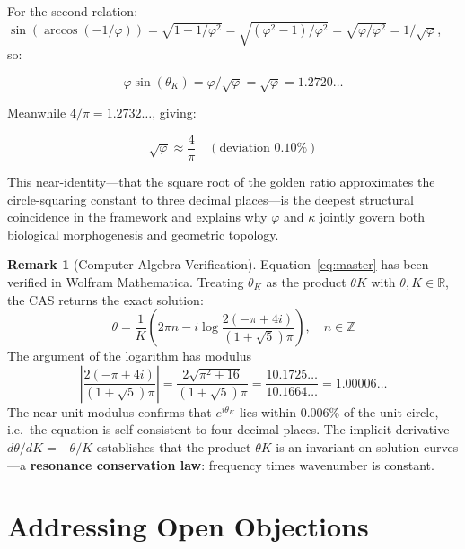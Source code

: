 \documentclass[12pt,a4paper]{article}
\theoremstyle{plain}
\theoremstyle{definition}
\newtheorem{remark}[theorem]{Remark}
\newcommand{\thetaK}{\theta_K}
\newcommand{\golden}{\varphi}
\newcommand{\kap}{\kappa}
\begin{document}
For the second relation: $\sin(\arccos(-1/\golden)) = \sqrt{1 - 1/\golden^2} = \sqrt{(\golden^2 - 1)/\golden^2} = \sqrt{\golden/\golden^2} = 1/\sqrt{\golden}$, so:

\begin{equation}
\golden \sin(\thetaK) = \golden / \sqrt{\golden} = \sqrt{\golden} = 1.2720\ldots
\end{equation}

Meanwhile $4/\pi = 1.2732\ldots$, giving:

\begin{equation}
\sqrt{\golden} \approx \frac{4}{\pi} \quad (\text{deviation } 0.10\%)
\end{equation}

This near-identity---that the square root of the golden ratio approximates the circle-squaring constant to three decimal places---is the deepest structural coincidence in the framework and explains why $\golden$ and $\kap$ jointly govern both biological morphogenesis and geometric topology.

\begin{remark}[Computer Algebra Verification]
\label{rem:wolfram}
Equation~\eqref{eq:master} has been verified in Wolfram Mathematica. Treating $\thetaK$ as the product $\theta K$ with $\theta, K \in \mathbb{R}$, the CAS returns the exact solution:
\begin{equation}
\theta = \frac{1}{K}\left(2\pi n - i\log\!\frac{2(-\pi + 4i)}{(1+\sqrt{5})\pi}\right), \quad n \in \mathbb{Z}
\end{equation}
The argument of the logarithm has modulus
\begin{equation}
\left|\frac{2(-\pi+4i)}{(1+\sqrt{5})\pi}\right| = \frac{2\sqrt{\pi^2+16}}{(1+\sqrt{5})\pi} = \frac{10.1725\ldots}{10.1664\ldots} = 1.00006\ldots
\end{equation}
The near-unit modulus confirms that $e^{i\thetaK}$ lies within $0.006\%$ of the unit circle, i.e.\ the equation is self-consistent to four decimal places. The implicit derivative $d\theta/dK = -\theta/K$ establishes that the product $\theta K$ is an invariant on solution curves---a \textbf{resonance conservation law}: frequency times wavenumber is constant.
\end{remark}

\section{Addressing Open Objections}
\label{sec:objections}
\end{document}
